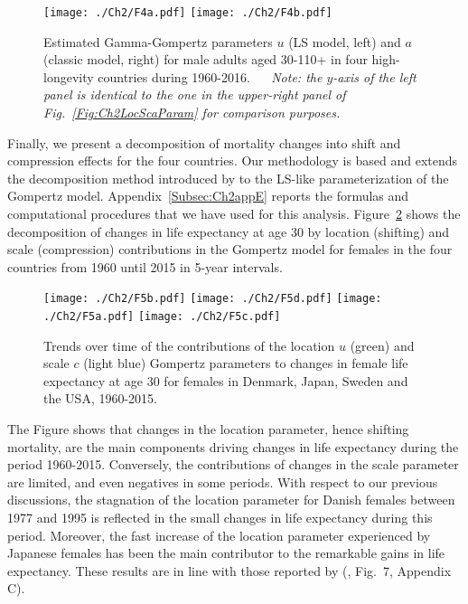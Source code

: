 \documentclass[Thesis]{subfiles}
\begin{document}
\begin{figure}[!ht]
	\centering
	\texttt{[image: ./Ch2/F4a.pdf]}
	\texttt{[image: ./Ch2/F4b.pdf]}		
	\caption{Estimated Gamma-Gompertz parameters $u$ (LS model, left) and $a$ (classic model, right) for male adults aged 30-110+ in four high-longevity countries during 1960-2016. $\quad$ \textit{Note: the $y$-axis of the left panel is identical to the one in the upper-right panel of Fig.~\ref{Fig:Ch2LocScaParam} for comparison purposes.}}\label{Fig:LocScaVsStand}
\end{figure}

Finally, we present a decomposition of mortality changes into shift and compression effects for the four countries. Our methodology is based and extends the decomposition method introduced by \cite{bergeron2015decomposing} to the LS-like parameterization of the Gompertz model. Appendix~\ref{Subsec:Ch2appE} reports the formulas and computational procedures that we have used for this analysis. Figure~\ref{Fig:Decomposition} shows the decomposition of changes in life expectancy at age 30 by location (shifting) and scale (compression) contributions in the Gompertz model for females in the four countries from 1960 until 2015 in 5-year intervals.

\begin{figure}[!ht]
	\begin{center}
		\texttt{[image: ./Ch2/F5b.pdf]}
		\texttt{[image: ./Ch2/F5d.pdf]} 
		\vspace{0.4cm}
		\texttt{[image: ./Ch2/F5a.pdf]}
		\texttt{[image: ./Ch2/F5c.pdf]}
		
		\caption{Trends over time of the contributions of the location $u$ (green) and scale $c$ (light blue) Gompertz parameters to changes in female life expectancy at age 30 for females in Denmark, Japan, Sweden and the USA, 1960-2015.\label{Fig:Decomposition}} 	
	\end{center}  
\end{figure}

The Figure shows that changes in the location parameter, hence shifting mortality, are the main components driving changes in life expectancy during the period 1960-2015. Conversely, the contributions of changes in the scale parameter are limited, and even negatives in some periods. With respect to our previous discussions, the stagnation of the location parameter for Danish females between 1977 and 1995 is reflected in the small changes in life expectancy during this period. Moreover, the fast increase of the location parameter experienced by Japanese females has been the main contributor to the remarkable gains in life expectancy. These results are in line with those reported by \citeauthor{bergeron2015decomposing} (\citeyear{bergeron2015decomposing}, Fig.~7, Appendix C).
\end{document}
